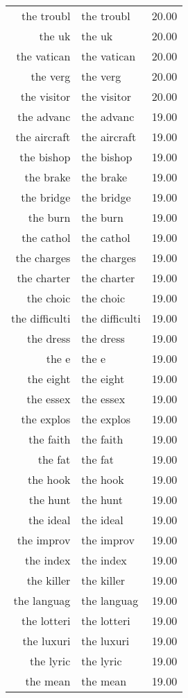 \begin{table}[ht]
\begin{tabular}{rlr}
  the troubl & the troubl & 20.00 \\ 
  the uk & the uk & 20.00 \\ 
  the vatican & the vatican & 20.00 \\ 
  the verg & the verg & 20.00 \\ 
  the visitor & the visitor & 20.00 \\ 
  the advanc & the advanc & 19.00 \\ 
  the aircraft & the aircraft & 19.00 \\ 
  the bishop & the bishop & 19.00 \\ 
  the brake & the brake & 19.00 \\ 
  the bridge & the bridge & 19.00 \\ 
  the burn & the burn & 19.00 \\ 
  the cathol & the cathol & 19.00 \\ 
  the charges & the charges & 19.00 \\ 
  the charter & the charter & 19.00 \\ 
  the choic & the choic & 19.00 \\ 
  the difficulti & the difficulti & 19.00 \\ 
  the dress & the dress & 19.00 \\ 
  the e & the e & 19.00 \\ 
  the eight & the eight & 19.00 \\ 
  the essex & the essex & 19.00 \\ 
  the explos & the explos & 19.00 \\ 
  the faith & the faith & 19.00 \\ 
  the fat & the fat & 19.00 \\ 
  the hook & the hook & 19.00 \\ 
  the hunt & the hunt & 19.00 \\ 
  the ideal & the ideal & 19.00 \\ 
  the improv & the improv & 19.00 \\ 
  the index & the index & 19.00 \\ 
  the killer & the killer & 19.00 \\ 
  the languag & the languag & 19.00 \\ 
  the lotteri & the lotteri & 19.00 \\ 
  the luxuri & the luxuri & 19.00 \\ 
  the lyric & the lyric & 19.00 \\ 
  the mean & the mean & 19.00 \\ 

\end{tabular}
\end{table}
